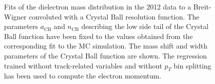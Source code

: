 \documentclass{cmspaper}
\begin{document}
\begin{figure}[h]
\centering
	\caption{Fits of the dielectron mass distribution in the 2012 data to
        a Breit-Wigner convoluted with a Crystal Ball resolution function. The parameters $a_{\mathrm{CB}}$ 
        and $n_{\mathrm{CB}}$ describing the low side tail of the Crystal Ball function have been fixed to the values
        obtained from the corresponding fit to the MC simulation. The mass shift and width parameters 
        of the Crystal Ball function are shown. The regression trained without track-related variables
        and without $p_{T}$ bin splitting has been used to compute the electron momentum.}
	\label{fig:ZMassFit_2012Data_Regression1}
\end{figure}

\clearpage
\end{document}
